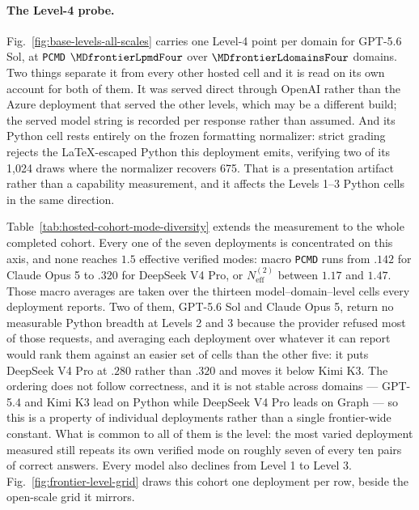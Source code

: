\documentclass{article}
\newcommand{\1}{\mathbf 1}
\newcommand{\pmd}{\texttt{PCMD}}
\newcommand{\neff}{\ensuremath{N^{(2)}_{\mathrm{eff}}}}
\theoremstyle{remark}
\theoremstyle{definition}
\theoremstyle{plain}
\begin{document}
\paragraph{The Level-4 probe.}
Fig.~\ref{fig:base-levels-all-scales} carries one Level-4 point per domain for
GPT-5.6 Sol, at \pmd{} $\MDfrontierLpmdFour$ over $\MDfrontierLdomainsFour$
domains. Two things separate it from every other hosted cell and it is read
on its own account for both of them. It was
served direct through OpenAI rather than the Azure deployment that served the
other levels, which may be a different build; the served model string is
recorded per response rather than assumed. And its Python cell rests entirely on
the frozen formatting normalizer: strict grading rejects the LaTeX-escaped
Python this deployment emits, verifying two of its 1,024 draws where the
normalizer recovers 675. That is a presentation artifact rather than a capability
measurement, and it affects the Levels 1--3 Python cells in the same direction.

Table~\ref{tab:hosted-cohort-mode-diversity} extends the measurement to the
whole completed cohort. Every one of the seven deployments is concentrated on
this axis, and none reaches $1.5$ effective verified modes: macro \pmd{} runs
from $.142$ for Claude Opus 5 to $.320$ for DeepSeek V4 Pro, or $\neff$ between
$1.17$ and $1.47$. Those macro averages are taken over the thirteen
model--domain--level cells every deployment reports. Two of them, GPT-5.6 Sol
and Claude Opus 5, return no measurable Python breadth at Levels 2 and 3
because the provider refused most of those requests, and averaging each
deployment over whatever it can report would rank them against an easier set of
cells than the other five: it puts DeepSeek V4 Pro at $.280$ rather than $.320$
and moves it below Kimi K3. The ordering does not follow correctness, and it is not stable
across domains --- GPT-5.4 and Kimi K3 lead on Python while DeepSeek V4 Pro
leads on Graph --- so this is a property of individual deployments rather than
a single frontier-wide constant. What is common to all of them is the level:
the most varied deployment measured still repeats its own verified mode on
roughly seven of every ten pairs of correct answers. Every model also declines
from Level 1 to Level 3. Fig.~\ref{fig:frontier-level-grid} draws this
cohort one deployment per row, beside the open-scale grid it mirrors.
\end{document}
